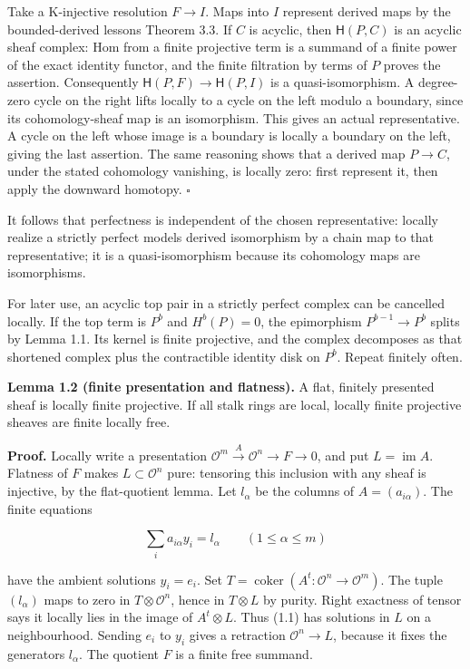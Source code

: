 \documentclass[
  english,
  11pt,
  a4paper,
]{article}
\begin{document}
Take a K-injective resolution \(F\to I\). Maps into \(I\) represent
derived maps by the bounded-derived lesson\textquotesingle s Theorem
3.3. If \(C\) is acyclic, then \(\mathsf H(P,C)\) is an acyclic sheaf
complex: Hom from a finite projective term is a summand of a finite
power of the exact identity functor, and the finite filtration by terms
of \(P\) proves the assertion. Consequently
\(\mathsf H(P,F)\to\mathsf H(P,I)\) is a quasi-isomorphism. A
degree-zero cycle on the right lifts locally to a cycle on the left
modulo a boundary, since its cohomology-sheaf map is an isomorphism.
This gives an actual representative. A cycle on the left whose image is
a boundary is locally a boundary on the left, giving the last assertion.
The same reasoning shows that a derived map \(P\to C\), under the stated
cohomology vanishing, is locally zero: first represent it, then apply
the downward homotopy. \(\square\)

It follows that perfectness is independent of the chosen representative:
locally realize a strictly perfect model\textquotesingle s derived
isomorphism by a chain map to that representative; it is a
quasi-isomorphism because its cohomology maps are isomorphisms.

For later use, an acyclic top pair in a strictly perfect complex can be
cancelled locally. If the top term is \(P^b\) and \(H^b(P)=0\), the
epimorphism \(P^{b-1}\to P^b\) splits by Lemma 1.1. Its kernel is finite
projective, and the complex decomposes as that shortened complex plus
the contractible identity disk on \(P^b\). Repeat finitely often.

\textbf{Lemma 1.2 (finite presentation and flatness).} A flat, finitely
presented sheaf is locally finite projective. If all stalk rings are
local, locally finite projective sheaves are finite locally free.

\textbf{Proof.} Locally write a presentation
\(\mathcal O^m\xrightarrow{A}\mathcal O^n\to F\to0\), and put
\(L=\operatorname{im}A\). Flatness of \(F\) makes
\(L\subset\mathcal O^n\) pure: tensoring this inclusion with any sheaf
is injective, by the flat-quotient lemma. Let \(l_\alpha\) be the
columns of \(A=(a_{i\alpha})\). The finite equations

\[\sum_i a_{i\alpha}y_i=l_\alpha
\qquad(1\le\alpha\le m)
\tag{1.1}\]

have the ambient solutions \(y_i=e_i\). Set
\(T=\operatorname{coker}(A^t:\mathcal O^n\to\mathcal O^m)\). The tuple
\((l_\alpha)\) maps to zero in \(T\otimes\mathcal O^n\), hence in
\(T\otimes L\) by purity. Right exactness of tensor says it locally lies
in the image of \(A^t\otimes L\). Thus (1.1) has solutions in \(L\) on a
neighbourhood. Sending \(e_i\) to \(y_i\) gives a retraction
\(\mathcal O^n\to L\), because it fixes the generators \(l_\alpha\). The
quotient \(F\) is a finite free summand.
\end{document}

